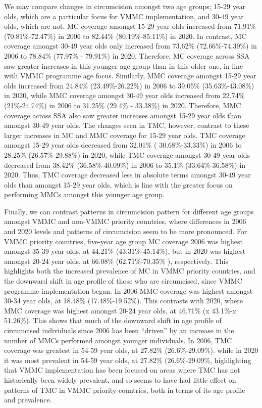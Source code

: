 \documentclass{article}
\begin{document}
We may compare changes in circumcision amongst two age groups; 15-29 year olds, which are a particular focus for VMMC implementation, and 30-49 year olds, which are not. MC coverage amongst 15-29 year olds increased from 71.91\% (70.81\%-72.47\%) in 2006 to 82.44\% (80.19\%-85.11\%) in 2020. In contrast, MC
coverage amongst 30-49 year olds only increased from 73.62\% (72.66\%-74.39\%) in 2006 to 78.84\% (77.97\%
- 79.91\%) in 2020. Therefore, MC coverage across SSA saw greater increases in this younger age group
than in this older one, in line with VMMC programme age focus. Similarly, MMC coverage amongst 15-29
year olds increased from 24.84\% (23.49\%-26.22\%) in 2006 to 39.05\% (35.63\%-43.08\%) in 2020, while
MMC coverage amongst 30-49 year olds increased from 22.74\% (21\%-24.74\%) in 2006 to 31.25\% (29.4\% -
33.38\%) in 2020. Therefore, MMC coverage across SSA also saw greater increases amongst 15-29 year olds
than amongst 30-49 year olds. The changes seen in TMC, however, contrast to these larger increases in MC
and MMC coverage for 15-29 year olds. TMC coverage amongst 15-29 year olds decreased from 32.01\% (
30.68\%-33.33\%) in 2006 to 28.25\% (26.57\%-29.88\%) in 2020, while TMC coverage amongst 30-49 year
olds decreased from 38.42\% (36.58\%-40.09\%) in 2006 to 35.1\% (33.64\%-36.58\%) in 2020. Thus, TMC
coverage decreased less in absolute terms amongst 30-49 year olds than amongst 15-29 year olds, which is line
with the greater focus on performing MMCs amongst this younger age group.

Finally, we can contrast patterns in circumcision pattern for different age groups amongst VMMC and
non-VMMC priority countries, where differences in 2006 and 2020 levels and patterns of circumcision seem to
be more pronounced.
For VMMC priority countries, five-year age group MC coverage 2006 was highest amongst 35-39 year olds, at
44.21\% (43.31\%-45.14\%), but in 2020 was highest amongst 20-24 year olds, at 66.08\% (62.71\%-70.35\%
), respectively. This highlights both the increased prevalence of MC in VMMC priority countries, and the
downward shift in age profile of those who are circumcised, since VMMC programme implementation began.
In 2006 MMC coverage was highest amongst 30-34 year olds, at 18.48\% (17.48\%-19.52\%). This contrasts
with 2020, where MMC coverage was highest amongst 20-24 year olds, at 46.71\% (x 43.1\%-x 51.26\%).
This shows that much of the downward shift in age profile of circumcised individuals since 2006 has been
“driven” by an increase in the number of MMCs performed amongst younger individuals. In 2006, TMC
coverage was greatest in 54-59 year olds, at 27.82\% (26.6\%-29.09\%). while in 2020 it was most prevalent
in 54-59 year olds, at 27.82\% (26.6\%-29.09\%, highlighting that VMMC implementation has been focused on areas where TMC has not historically been widely prevalent, and so seems to have had little effect on patterns of TMC in VMMC priority countries, both in terms of its age profile and prevalence.
\end{document}
